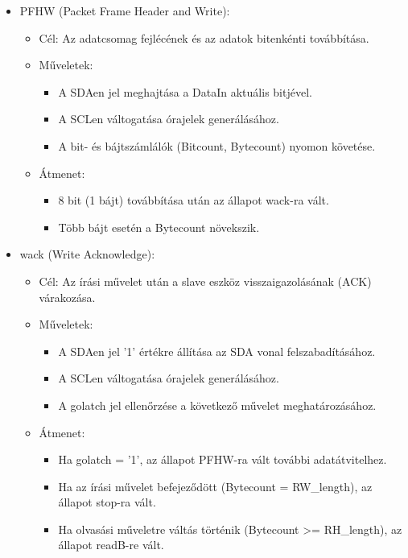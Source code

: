 \documentclass[a4paper,12pt,oneside]{book}
\begin{document}
\begin{itemize}
	 \item PFHW (Packet Frame Header and Write):
    \begin{itemize}
        \item Cél: Az adatcsomag fejlécének és az adatok bitenkénti továbbítása.
        \item Műveletek:
        \begin{itemize}
            \item A SDAen jel meghajtása a DataIn aktuális bitjével.
            \item A SCLen váltogatása órajelek generálásához.
            \item A bit- és bájtszámlálók (Bitcount, Bytecount) nyomon követése.
        \end{itemize}
        \item Átmenet:
        \begin{itemize}
            \item 8 bit (1 bájt) továbbítása után az állapot wack-ra vált.
            \item Több bájt esetén a Bytecount növekszik.
        \end{itemize}
    \end{itemize}
    \item wack (Write Acknowledge):
    \begin{itemize}
        \item Cél: Az írási művelet után a slave eszköz visszaigazolásának (ACK) várakozása.
        \item Műveletek:
        \begin{itemize}
            \item A SDAen jel '1' értékre állítása az SDA vonal felszabadításához.
            \item A SCLen váltogatása órajelek generálásához.
            \item A golatch jel ellenőrzése a következő művelet meghatározásához.
        \end{itemize}
        \item Átmenet:
        \begin{itemize}
            \item Ha golatch = '1', az állapot PFHW-ra vált további adatátvitelhez.
            \item Ha az írási művelet befejeződött (Bytecount = RW\_length), az állapot stop-ra vált.
            \item Ha olvasási műveletre váltás történik (Bytecount >= RH\_length), az állapot readB-re vált.
        \end{itemize}

\end{itemize}
\end{itemize}
\end{document}
